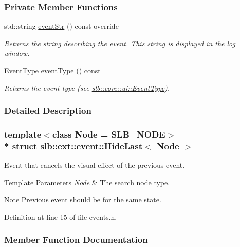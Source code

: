 \subsubsection*{Private Member Functions}
\begin{DoxyCompactItemize}
\item 
std\+::string \hyperlink{structslb_1_1ext_1_1event_1_1HideLast_a9fa730d4078628681e2a2aea4d07fbee}{event\+Str} () const override
\begin{DoxyCompactList}\small\item\em Returns the string describing the event. This string is displayed in the log window. \end{DoxyCompactList}\item 
Event\+Type \hyperlink{structslb_1_1ext_1_1event_1_1HideLast_ac9fee726fd7cca33eaa55c120490aa9a}{event\+Type} () const 
\begin{DoxyCompactList}\small\item\em Returns the event type (see \hyperlink{namespaceslb_1_1core_1_1ui_ae44f7078122b3f63928fd619fadd2dcd}{slb\+::core\+::ui\+::\+Event\+Type}). \end{DoxyCompactList}\end{DoxyCompactItemize}


\subsubsection{Detailed Description}
\subsubsection*{template$<$class Node = S\+L\+B\+\_\+\+N\+O\+DE$>$\\*
struct slb\+::ext\+::event\+::\+Hide\+Last$<$ Node $>$}

Event that cancels the visual effect of the previous event. 


\begin{DoxyTemplParams}{Template Parameters}
{\em Node} & The search node type. \\
\hline
\end{DoxyTemplParams}
\begin{DoxyNote}{Note}
Previous event should be for the same state. 
\end{DoxyNote}


Definition at line 15 of file events.\+h.



\subsubsection{Member Function Documentation}
